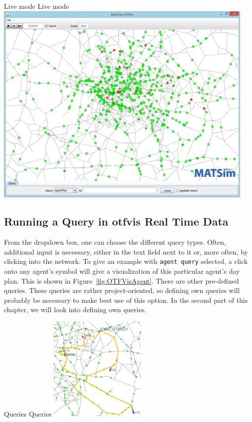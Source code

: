 \createfigure%
{Live mode}%
{Live mode}%
{\label{fig:OTFVisLive}}%
{\includegraphics[width=0.95\textwidth, angle=0]{extending/figures/otfvis/image04.png}}%
{}

\subsection{Running a Query in \gls{otfvis} Real Time Data}
From the dropdown box, one can choose the different query types. 
Often, additional input is necessary, either in the text field next to it or, more often, by clicking into the network. 
To give an example with \lstinline|agent query| selected, a click onto any agent's symbol will give a visualization of this particular agent's day plan. 
This is shown in Figure~\ref{fig:OTFVisAgent}. There are other pre-defined queries. 
These queries are rather project-oriented, so defining own queries will probably be necessary to make best use of this option. 
In the second part of this chapter, we will look into defining own queries.

\createfigure%
{Queries}%
{Queries}%
{\label{fig:OTFVisAgent}}%
{\includegraphics[width=0.35\textwidth, angle=0]{extending/figures/otfvis/image08.png}}%
{}


